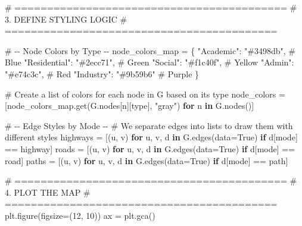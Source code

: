 \documentclass[
  letterpaper,
  DIV=11,
  numbers=noendperiod]{scrreprt}
\newenvironment{Shaded}{\begin{snugshade}}{\end{snugshade}}
\newcommand{\CommentTok}[1]{\textcolor[rgb]{0.37,0.37,0.37}{#1}}
\newcommand{\ControlFlowTok}[1]{\textcolor[rgb]{0.00,0.23,0.31}{\textbf{#1}}}
\newcommand{\DecValTok}[1]{\textcolor[rgb]{0.68,0.00,0.00}{#1}}
\newcommand{\KeywordTok}[1]{\textcolor[rgb]{0.00,0.23,0.31}{\textbf{#1}}}
\newcommand{\NormalTok}[1]{\textcolor[rgb]{0.00,0.23,0.31}{#1}}
\newcommand{\OperatorTok}[1]{\textcolor[rgb]{0.37,0.37,0.37}{#1}}
\newcommand{\StringTok}[1]{\textcolor[rgb]{0.13,0.47,0.30}{#1}}
\newcommand{\VariableTok}[1]{\textcolor[rgb]{0.07,0.07,0.07}{#1}}
\begin{document}
\begin{Shaded}
\begin{Highlighting}[]
\CommentTok{\# ==========================================}
\CommentTok{\# 3. DEFINE STYLING LOGIC}
\CommentTok{\# ==========================================}

\CommentTok{\# {-}{-} Node Colors by Type {-}{-}}
\NormalTok{node\_colors\_map }\OperatorTok{=}\NormalTok{ \{}
    \StringTok{"Academic"}\NormalTok{: }\StringTok{"\#3498db"}\NormalTok{,    }\CommentTok{\# Blue}
    \StringTok{"Residential"}\NormalTok{: }\StringTok{"\#2ecc71"}\NormalTok{, }\CommentTok{\# Green}
    \StringTok{"Social"}\NormalTok{: }\StringTok{"\#f1c40f"}\NormalTok{,      }\CommentTok{\# Yellow}
    \StringTok{"Admin"}\NormalTok{: }\StringTok{"\#e74c3c"}\NormalTok{,       }\CommentTok{\# Red}
    \StringTok{"Industry"}\NormalTok{: }\StringTok{"\#9b59b6"}     \CommentTok{\# Purple}
\NormalTok{\}}

\CommentTok{\# Create a list of colors for each node in G based on its type}
\NormalTok{node\_colors }\OperatorTok{=}\NormalTok{ [node\_colors\_map.get(G.nodes[n][}\StringTok{\textquotesingle{}type\textquotesingle{}}\NormalTok{], }\StringTok{"gray"}\NormalTok{) }\ControlFlowTok{for}\NormalTok{ n }\KeywordTok{in}\NormalTok{ G.nodes()]}

\CommentTok{\# {-}{-} Edge Styles by Mode {-}{-}}
\CommentTok{\# We separate edges into lists to draw them with different styles}
\NormalTok{highways }\OperatorTok{=}\NormalTok{ [(u, v) }\ControlFlowTok{for}\NormalTok{ u, v, d }\KeywordTok{in}\NormalTok{ G.edges(data}\OperatorTok{=}\VariableTok{True}\NormalTok{) }\ControlFlowTok{if}\NormalTok{ d[}\StringTok{\textquotesingle{}mode\textquotesingle{}}\NormalTok{] }\OperatorTok{==} \StringTok{\textquotesingle{}highway\textquotesingle{}}\NormalTok{]}
\NormalTok{roads    }\OperatorTok{=}\NormalTok{ [(u, v) }\ControlFlowTok{for}\NormalTok{ u, v, d }\KeywordTok{in}\NormalTok{ G.edges(data}\OperatorTok{=}\VariableTok{True}\NormalTok{) }\ControlFlowTok{if}\NormalTok{ d[}\StringTok{\textquotesingle{}mode\textquotesingle{}}\NormalTok{] }\OperatorTok{==} \StringTok{\textquotesingle{}road\textquotesingle{}}\NormalTok{]}
\NormalTok{paths    }\OperatorTok{=}\NormalTok{ [(u, v) }\ControlFlowTok{for}\NormalTok{ u, v, d }\KeywordTok{in}\NormalTok{ G.edges(data}\OperatorTok{=}\VariableTok{True}\NormalTok{) }\ControlFlowTok{if}\NormalTok{ d[}\StringTok{\textquotesingle{}mode\textquotesingle{}}\NormalTok{] }\OperatorTok{==} \StringTok{\textquotesingle{}path\textquotesingle{}}\NormalTok{]}

\CommentTok{\# ==========================================}
\CommentTok{\# 4. PLOT THE MAP}
\CommentTok{\# ==========================================}
\NormalTok{plt.figure(figsize}\OperatorTok{=}\NormalTok{(}\DecValTok{12}\NormalTok{, }\DecValTok{10}\NormalTok{))}
\NormalTok{ax }\OperatorTok{=}\NormalTok{ plt.gca()}


\end{Highlighting}
\end{Shaded}
\end{document}
